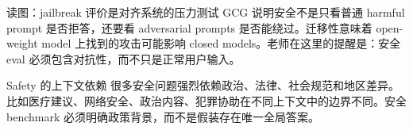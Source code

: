 \begin{warningbox}{读图：jailbreak 评价是对齐系统的压力测试}
GCG 说明安全不是只看普通 harmful prompt 是否拒答，还要看 adversarial prompts 是否能绕过。迁移性意味着 open-weight model 上找到的攻击可能影响 closed models。老师在这里的提醒是：安全 eval 必须包含对抗性，而不只是正常用户输入。
\end{warningbox}

\begin{importantbox}{Safety 的上下文依赖}
很多安全问题强烈依赖政治、法律、社会规范和地区差异。比如医疗建议、网络安全、政治内容、犯罪协助在不同上下文中的边界不同。安全 benchmark 必须明确政策背景，而不是假装存在唯一全局答案。
\end{importantbox}

